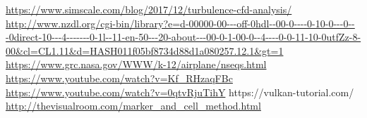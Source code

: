 \documentclass{article}
\begin{document}
\begin{thebibliography}{3}
\url{https://www.simscale.com/blog/2017/12/turbulence-cfd-analysis/}
\url{http://www.nzdl.org/cgi-bin/library?e=d-00000-00---off-0hdl--00-0----0-10-0---0---0direct-10---4-------0-1l--11-en-50---20-about---00-0-1-00-0--4----0-0-11-10-0utfZz-8-00\&cl=CL1.11\&d=HASH011f05bf8734d88d1a080257.12.1\&gt=1}
\url{https://www.grc.nasa.gov/WWW/k-12/airplane/nseqs.html}
\url{https://www.youtube.com/watch?v=Kf_RHzaqFBc}
\url{https://www.youtube.com/watch?v=0qtvRjuTihY}
https://vulkan-tutorial.com/
\url{http://thevisualroom.com/marker_and_cell_method.html}
\end{thebibliography}
\end{document}
